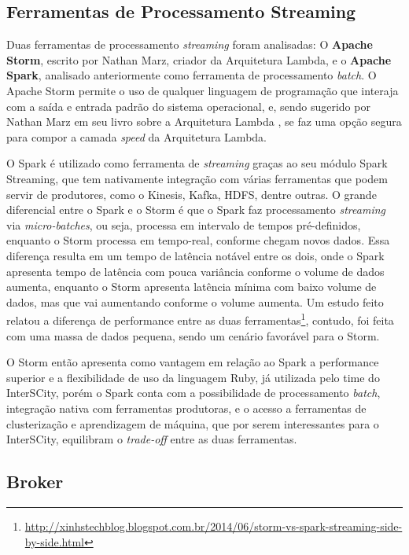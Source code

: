 \subsection{Ferramentas de Processamento Streaming}

Duas ferramentas de processamento \textit{streaming} foram analisadas: O
\textbf{Apache Storm}, escrito por Nathan Marz, criador da Arquitetura
Lambda, e o \textbf{Apache Spark}, analisado anteriormente como ferramenta de
processamento \textit{batch}. O Apache Storm permite o uso de qualquer
linguagem de programação que interaja com a saída e entrada padrão do sistema
operacional, e, sendo sugerido por Nathan Marz em seu livro sobre a Arquitetura
Lambda \cite{marz2015}, se faz uma opção segura para compor a camada
\textit{speed} da Arquitetura Lambda.

O Spark é utilizado como ferramenta de \textit{streaming} graças ao seu módulo
Spark Streaming, que tem nativamente integração com várias ferramentas que
podem servir de produtores, como o Kinesis, Kafka, HDFS, dentre outras. O
grande diferencial entre o Spark e o Storm é que o Spark faz processamento
\textit{streaming} via \textit{micro-batches}, ou seja, processa em intervalo
de tempos pré-definidos, enquanto o Storm processa em tempo-real, conforme
chegam novos dados. Essa diferença resulta em um tempo de latência notável
entre os dois, onde o Spark apresenta tempo de latência com pouca variância
conforme o volume de dados aumenta, enquanto o Storm apresenta latência mínima
com baixo volume de dados, mas que vai aumentando conforme o volume aumenta.
Um estudo feito relatou a diferença de performance entre as duas
ferramentas\footnote{\url{http://xinhstechblog.blogspot.com.br/2014/06/storm-vs-spark-streaming-side-by-side.html}},
contudo, foi feita com uma massa de dados pequena, sendo um cenário favorável
para o Storm.

O Storm então apresenta como vantagem em relação ao Spark a performance
superior e a flexibilidade de uso da linguagem Ruby, já utilizada pelo time
do InterSCity, porém o Spark conta com a possibilidade de processamento
\textit{batch}, integração nativa com ferramentas produtoras, e o acesso a
ferramentas de clusterização e aprendizagem de máquina, que por serem
interessantes para o InterSCity, equilibram o \textit{trade-off} entre as
duas ferramentas.

\subsection{Broker}

